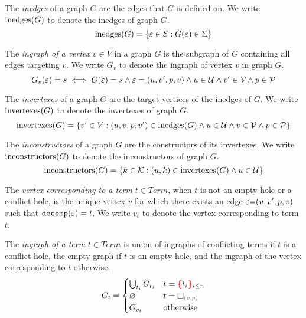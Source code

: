 \begin{definition}
  The \emph{inedges} of a graph $G$ are the edges that $G$ is defined on.
  We write $\text{inedges}\mathopen{}\left(G\right)\mathclose{}$ to denote the inedges of graph $G$.
  \[
    \text{inedges}\mathopen{}\left(G\right)\mathclose{} = \left\{\varepsilon \in \mathcal{E} : G(\varepsilon) \in \Sigma\right\}
  \]
\end{definition}

\begin{definition}
  The \emph{ingraph of a vertex} $v \in V$ in a graph $G$
  is the subgraph of $G$ containing all edges targeting $v$.
  We write $G_v$ to denote the ingraph of vertex $v$ in graph $G$.
  \[
    G_v(\varepsilon) = s \iff G(\varepsilon) = s \land \varepsilon = (u, v', p, v) \land u \in \mathcal{U} \land v' \in \mathcal{V} \land p \in \mathcal{P}
  \]
\end{definition}

\begin{definition}
  The \emph{invertexes} of a graph $G$ are the target vertices of the inedges of $G$.
  We write $\text{invertexes}\mathopen{}\left(G\right)\mathclose{}$ to denote the invertexes of graph $G$.
  \[
    \text{invertexes}\mathopen{}\left(G\right)\mathclose{} = \left\{v' \in V : (u, v, p, v') \in \text{inedges}\mathopen{}\left(G\right)\mathclose{} \land u \in \mathcal{U} \land v \in \mathcal{V} \land p \in \mathcal{P}\right\}
  \]
\end{definition}

\begin{definition}
  The \emph{inconstructors} of a graph $G$ are the constructors of its invertexes.
  We write $\text{inconstructors}\mathopen{}\left(G\right)\mathclose{}$ to denote the inconstructors of graph $G$.
  \[
    \text{inconstructors}\mathopen{}\left(G\right)\mathclose{} = \left\{k \in \mathcal{K} : (u, k) \in \text{invertexes}\mathopen{}\left(G\right)\mathclose{} \land u \in \mathcal{U}\right\}
  \]
\end{definition}

\begin{definition}
  The \emph{vertex corresponding to a term} $t \in Term$,
  when $t$ is not an empty hole or a conflict hole,
  is the unique vertex $v$ for which there exists an edge $\varepsilon{=}(u, v', p, v)$ such that $\operatorname{\texttt{decomp}}\mathopen{}\left(\varepsilon\right)\mathclose{} = t$.
  We write $v_t$ to denote the vertex corresponding to term $t$.
\end{definition}

\begin{definition}
  The \emph{ingraph of a term} $t \in Term$
  is union of ingraphs of conflicting terms if $t$ is a conflict hole,
  the empty graph if $t$ is an empty hole,
  and the ingraph of the vertex corresponding to $t$ otherwise.
  \[
    G_t =
    \begin{cases}
      \bigcup_{t_i} G_{t_i} & t = \conflictHole[i \leq n]{t_i} \\
      \varnothing & t = \emptyHole{v}{p} \\
      G_{v_t} & \text{otherwise} \\
    \end{cases}
  \]
\end{definition}

